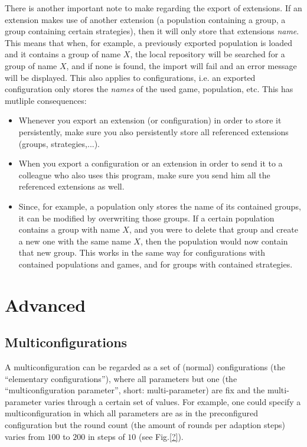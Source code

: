 \documentclass[parskip=full,11pt]{scrartcl}
\begin{document}
There is another important note to make regarding the export of extensions. If an extension makes use of another extension (a population containing a group, a group containing certain strategies), then it will only store that extensions \textit{name}. This means that when, for example, a previously exported population is loaded and it contains a group of name \(X\), the local repository will be searched for a group of name \(X\), and if none is found, the import will fail and an error message will be displayed. This also applies to configurations, i.e. an exported configuration only stores the \textit{names} of the used game, population, etc. This has mutliple consequences:
\begin{itemize}
\item Whenever you export an extension (or configuration) in order to store it persistently, make sure you also persistently store all referenced extensions (groups, strategies,...).
\item When you export a configuration or an extension in order to send it to a colleague who also uses this program, make sure you send him all the referenced extensions as well.
\item Since, for example, a population only stores the name of its contained groups, it can be modified by overwriting those groups. If a certain population contains a group with name \(X\), and you were to delete that group and create a new one with the same name \(X\), then the population would now contain that new group. This works in the same way for configurations with contained populations and games, and for groups with contained strategies.
\end{itemize}

\section{Advanced}

\subsection{Multiconfigurations}\label{sec:multi_config}
A multiconfiguration can be regarded as a set of (normal) configurations (the \enquote{elementary configurations}), where all parameters but one (the \enquote{multiconfiguration parameter}, short: multi-parameter) are fix and the multi-parameter varies through a certain set of values. For example, one could specify a multiconfiguration in which all parameters are as in the preconfigured configuration but the round count (the amount of rounds per adaption steps) varies from \(100\) to \(200\) in steps of \(10\) (see Fig.\ref{?}).
\end{document}
